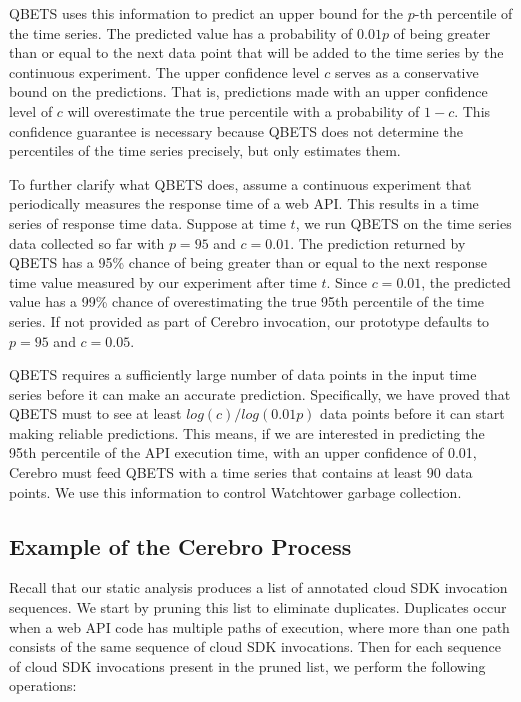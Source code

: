 QBETS uses this information to predict an upper bound for 
the $p$-th percentile of the time series.
The predicted value has a probability of $0.01p$ of 
being greater than or equal to the next data point that
will be added to the time series by the continuous experiment. 
The upper confidence level $c$ serves as a conservative
bound on the predictions. That is, predictions made with an upper confidence 
level of $c$ will overestimate
the true percentile with a probability of $1-c$. This confidence guarantee 
is necessary because 
QBETS does not determine the 
percentiles of the time series precisely, but only estimates them. 

To further clarify what QBETS does, assume a continuous experiment 
that periodically measures the
response time of a web API. This results in a time series of 
response time data. Suppose at time $t$,
we run QBETS on the time series data collected so far 
with $p=95$ and $c=0.01$. The prediction returned
by QBETS has a 95\% chance of being greater than or equal 
to the next response time value measured
by our experiment after time $t$. Since $c=0.01$, the predicted value has a 99\% chance of
overestimating the true 95th percentile of the time series.
If not provided as part of Cerebro invocation, our prototype 
defaults to $p=95$ and $c=0.05$. 


QBETS requires a sufficiently large number of data points
in the input time series before it can make an accurate prediction. 
Specifically, we have proved that QBETS must to see 
at least $log(c)/log(0.01p)$ data points
before it can start making reliable predictions. 
This means, if we are interested in predicting the 95th percentile
of the API execution time, with an upper confidence of 0.01, 
Cerebro must feed QBETS with a time series that
contains at least 90 data points. We use this information to control 
Watchtower garbage collection.


\subsection{Example of the Cerebro Process}
Recall that our static analysis produces a list of annotated cloud SDK invocation sequences.
We start by pruning this list to eliminate duplicates. 
Duplicates occur when a web API code has
multiple paths of execution, where more than one path consists of the same sequence of cloud 
SDK invocations. Then for each sequence of cloud SDK 
invocations present in the pruned list, we
perform the following operations:

